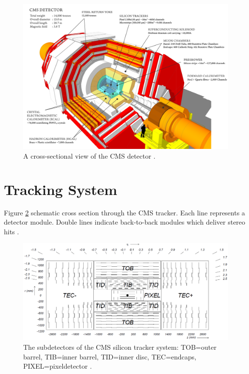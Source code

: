\begin{figure}\label{fig-CMSDetector}
\includegraphics[width=\textwidth]{Figures/CMSDetector.png}
\caption{A cross-sectional view of the CMS detector \cite{}.}
\end{figure}

\section{Tracking System} \label{sec-TrackingSystem}

Figure \ref{fig-Tracker} schematic cross section through the CMS tracker. Each line represents a detector module. Double lines indicate back-to-back modules which deliver stereo hits \cite{CMSexperiment}.

\begin{figure}\label{fig-Tracker}
\includegraphics[width=\textwidth]{Figures/Tracker.png}
\caption{The subdetectors of the CMS silicon tracker system: TOB=outer barrel, TIB=inner barrel, TID=inner disc, TEC=endcaps, PIXEL=pixeldetector \cite{}.}
\end{figure}

